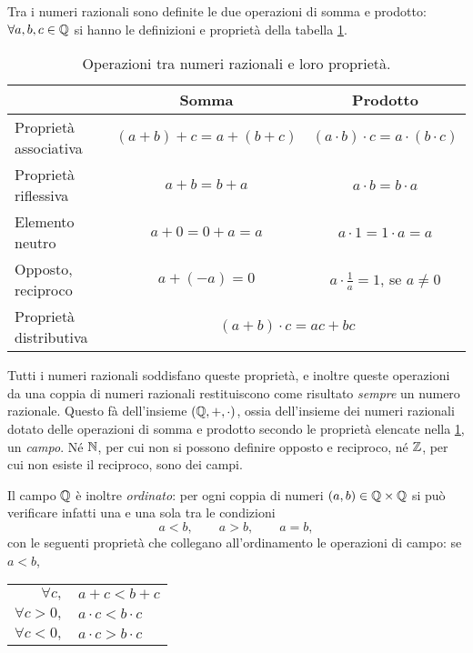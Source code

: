 Tra i numeri razionali sono definite le due operazioni di somma e prodotto: $\forall a,b,c\in\mathbb{Q}$ si hanno le definizioni e proprietà della tabella \ref{tab:operazioni-Q}.
\begin{table}
\centering
\begin{tabular}{lcc}
\toprule
{}&Somma&Prodotto\\
\midrule
Proprietà associativa&$(a+b)+c=a+(b+c)$&$(a\cdot b)\cdot c=a\cdot(b\cdot c)$\\
Proprietà riflessiva&$a+b=b+a$&$a\cdot b=b\cdot a$\\
Elemento neutro&$a+0=0+a=a$&$a\cdot 1=1\cdot a=a$\\
Opposto, reciproco&$a+(-a)=0$&$a\cdot\frac1{a}=1$, se $a\neq0$\\
Proprietà distributiva&\multicolumn{2}{c}{$(a+b)\cdot c=ac+bc$}\\
\bottomrule
\end{tabular}
\caption{Operazioni tra numeri razionali e loro proprietà.}
\label{tab:operazioni-Q}
\end{table}
Tutti i numeri razionali soddisfano queste proprietà, e inoltre queste operazioni da una coppia di numeri razionali restituiscono come risultato \emph{sempre} un numero razionale. Questo fà dell'insieme $(\mathbb{Q},+,\cdot)$, ossia dell'insieme dei numeri razionali dotato delle operazioni di somma e prodotto secondo le proprietà elencate nella \ref{tab:operazioni-Q}, un \emph{campo}.
Né $\mathbb{N}$, per cui non si possono definire opposto e reciproco, né $\mathbb{Z}$, per cui non esiste il reciproco, sono dei campi.

Il campo $\mathbb{Q}$ è inoltre \emph{ordinato}: per ogni coppia di numeri $(a,b)\in\mathbb{Q}\times\mathbb{Q}$ si può verificare infatti una e una sola tra le condizioni
\[
a<b,\qquad a>b,\qquad a=b,
\]
con le seguenti proprietà che collegano all'ordinamento le operazioni di campo: se $a<b$,
\begin{center}
\begin{tabular}{rl}
$\forall c,$&$a+c<b+c$\\
$\forall c>0,$&$a\cdot c<b\cdot c$\\
$\forall c<0,$&$a\cdot c>b\cdot c$
\end{tabular}
\end{center}

